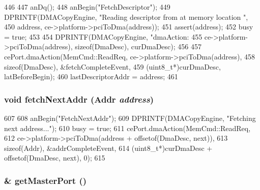 \begin{DoxyCode}
446 {
447     anDq();
448     anBegin("FetchDescriptor");
449     DPRINTF(DMACopyEngine, "Reading descriptor from at memory location %
      ",
450            address, ce->platform->pciToDma(address));
451     assert(address);
452     busy = true;
453 
454     DPRINTF(DMACopyEngine, "dmaAction: %
455             ce->platform->pciToDma(address), sizeof(DmaDesc), curDmaDesc);
456 
457     cePort.dmaAction(MemCmd::ReadReq, ce->platform->pciToDma(address),
458                      sizeof(DmaDesc), &fetchCompleteEvent,
459                      (uint8_t*)curDmaDesc, latBeforeBegin);
460     lastDescriptorAddr = address;
461 }
\end{DoxyCode}
\hypertarget{classCopyEngine_1_1CopyEngineChannel_a2569cf33044109a5a992ef1452cf7a7c}{
\subsubsection[{fetchNextAddr}]{\setlength{\rightskip}{0pt plus 5cm}void fetchNextAddr ({\bf Addr} {\em address})}}
\label{classCopyEngine_1_1CopyEngineChannel_a2569cf33044109a5a992ef1452cf7a7c}



\begin{DoxyCode}
607 {
608     anBegin("FetchNextAddr");
609     DPRINTF(DMACopyEngine, "Fetching next address...\n");
610     busy = true;
611     cePort.dmaAction(MemCmd::ReadReq,
612                      ce->platform->pciToDma(address + offsetof(DmaDesc, next)),
613                      sizeof(Addr), &addrCompleteEvent,
614                      (uint8_t*)curDmaDesc + offsetof(DmaDesc, next), 0);
615 }
\end{DoxyCode}
\hypertarget{classCopyEngine_1_1CopyEngineChannel_a4e826c60c407af047c6cfdcba5f79467}{
\subsubsection[{getMasterPort}]{ \& getMasterPort ()}}
\label{classCopyEngine_1_1CopyEngineChannel_a4e826c60c407af047c6cfdcba5f79467}



